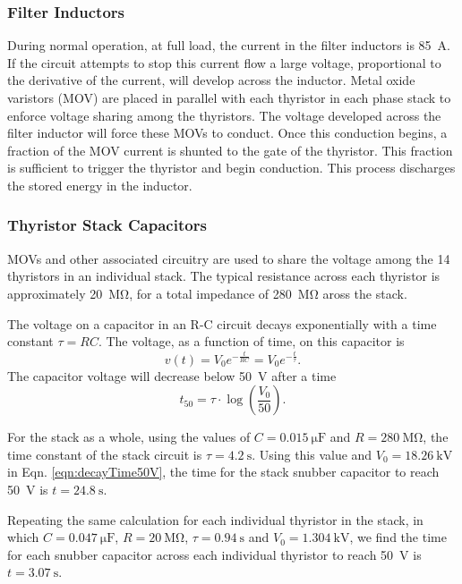 \documentclass[letterpaper,11pt]{article}
\begin{document}
\subsubsection{Filter Inductors}
During normal operation, at full load, the current in the filter inductors is \SI{85}{\ampere}.  If the circuit attempts to stop this current flow a large voltage, proportional to the derivative of the current, will develop across the inductor.  Metal oxide varistors (MOV) are placed in parallel with each thyristor in each phase stack to enforce voltage sharing among the thyristors.  The voltage developed across the filter inductor will force these MOVs to conduct.  Once this conduction begins, a fraction of the MOV current is shunted to the gate of the thyristor.  This fraction is sufficient to trigger the thyristor and begin conduction.  This process discharges the stored energy in the inductor.

\subsubsection{Thyristor Stack Capacitors}
MOVs and other associated circuitry are used to share the voltage among the 14 thyristors in an individual stack.  The typical resistance across each thyristor is approximately \SI{20}{\mega\ohm}, for a total impedance of \SI{280}{\mega\ohm} aross the stack.

The voltage on a capacitor in an R-C circuit decays exponentially with a time constant $\tau = RC$.  The voltage, as a function of time, on this capacitor is
\begin{equation}\label{eqn:rcDecay}
	v\left(t\right) = V_{0}e^{-\frac{t}{RC}} = V_{0}e^{-\frac{t}{\tau}}.
\end{equation}
The capacitor voltage will decrease below \SI{50}{\volt} after a time
\begin{equation}\label{eqn:decayTime50V}
	t_{50} = \tau\cdot\log\left(\frac{V_{0}}{50}\right).
\end{equation}

For the stack as a whole, using the values of $C = \SI{0.015}{\micro\farad}$ and $R = \SI{280}{\mega\ohm}$, the time constant of the stack circuit is $\tau = \SI{4.2}{\second}$.  Using this value and $V_{0} = \SI{18.26}{\kV}$ in Eqn. \ref{eqn:decayTime50V}, the time for the stack snubber capacitor to reach \SI{50}{\volt} is $t =\SI{24.8}{\second}$.

Repeating the same calculation for each individual thyristor in the stack, in which $C = \SI{0.047}{\micro\farad}$, $R = \SI{20}{\mega\ohm}$, $\tau = \SI{0.94}{\second}$ and $V_{0} = \SI{1.304}{\kV}$, we find the time for each snubber capacitor across each individual thyristor to reach \SI{50}{\volt} is $t =\SI{3.07}{\second}$.
\end{document}
